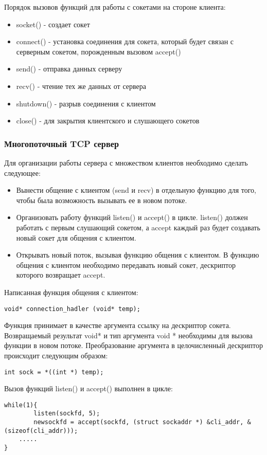 Порядок вызовов функций для работы с сокетами на стороне клиента:
\begin{itemize}
\item socket() - создает сокет
\item connect() - установка соединения для сокета, который будет связан с серверным сокетом, порожденным вызовом accept()
\item send() - отправка данных серверу
\item recv() - чтение тех же данных от сервера
\item shutdown() - разрыв соединения с клиентом
\item close() - для закрытия клиентского и слушающего сокетов
\end{itemize}

\subsubsection{Многопоточный TCP сервер}
Для организации работы сервера с множеством клиентов необходимо сделать следующее:
\begin{itemize}
\item Вынести общение с клиентом (send и recv) в отдельную функцию для того, чтобы была возможность вызывать ее в новом потоке.
\item Организовать работу функций listen() и accept() в цикле.
listen() должен работать с первым слушающий сокетом, а accept каждый раз будет создавать новый сокет для общения с клиентом.
\item Открывать новый поток, вызывая функцию общения с клиентом.
В функцию общения с клиентом необходимо передавать новый сокет, дескриптор которого возвращает accept.
\end{itemize}
Написанная функция общения с клиентом:
\begin{lstlisting}
void* connection_hadler (void* temp);
\end{lstlisting}
Функция принимает в качестве аргумента ссылку на дескриптор сокета. Возвращаемый результат void* и тип аргумента void * необходимы для вызова функции в новом потоке.
Преобразование аргумента в целочисленный дескриптор происходит следующим образом:
\begin{lstlisting}
int sock = *((int *) temp);
\end{lstlisting}

Вызов функций listen() и accept() выполнен в цикле:
\begin{lstlisting}
while(1){
        listen(sockfd, 5);
        newsockfd = accept(sockfd, (struct sockaddr *) &cli_addr, &(sizeof(cli_addr)));
	.....
}
\end{lstlisting}

